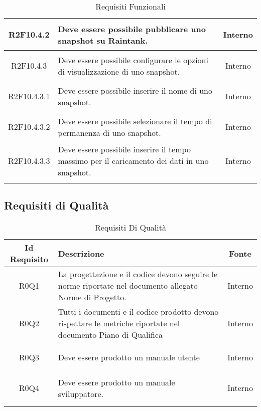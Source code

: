 \begin{longtable}{|c|H|c|}
	\hypertarget{R2F10.4.2}{R2F10.4.2} & Deve essere possibile pubblicare uno snapshot su Raintank. & Interno \\ \hline 
	\hypertarget{R2F10.4.3}{R2F10.4.3} & Deve essere possibile configurare le opzioni di visualizzazione di uno snapshot. & Interno \\ \hline 
	\hypertarget{R2F10.4.3.1}{R2F10.4.3.1} & Deve essere possibile inserire il nome di uno snapshot. & Interno \\ \hline 
	\hypertarget{R2F10.4.3.2}{R2F10.4.3.2} & Deve essere possibile selezionare il tempo di permanenza di uno snapshot. & Interno \\ \hline 
	\hypertarget{R2F10.4.3.3}{R2F10.4.3.3} & Deve essere possibile inserire il tempo massimo per il caricamento dei dati in uno snapshot. & Interno \\ \hline 
	
	\caption[Requisiti Funzionali]{Requisiti Funzionali}
	\label{tabella:req0}
\end{longtable}
\clearpage
{}
\subsection{Requisiti di Qualità}
\normalsize
\begin{longtable}{|c|H|c|}
	\hline
	\textbf{Id Requisito} & \textbf{Descrizione} & \textbf{Fonte}\\
	\hline
	\endhead
	\hypertarget{R0Q1}{R0Q1} & La progettazione e il codice devono seguire le norme riportate nel documento allegato Norme di Progetto. & Interno \\ \hline 
	\hypertarget{R0Q2}{R0Q2} & Tutti i documenti e il codice prodotto devono rispettare le metriche riportate nel documento Piano di Qualifica & Interno \\ \hline 
	\hypertarget{R0Q3}{R0Q3} & Deve essere prodotto un manuale utente & Interno \\ \hline 
	\hypertarget{R0Q4}{R0Q4} & Deve essere prodotto un manuale sviluppatore. & Interno \\ \hline 
	\caption[Requisiti di Qualità]{Requisiti Di Qualità}
	\label{tabella:req1}
\end{longtable}
\clearpage
{}
